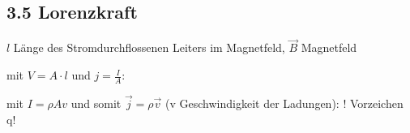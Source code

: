 \subsection*{3.5 Lorenzkraft}
    $l$ Länge des Stromdurchflossenen Leiters im Magnetfeld, $\overrightarrow{B}$ Magnetfeld
    
    mit $V = A \cdot l$ und $j = \frac{I}{A}$:

    mit $I = \rho A v$ und somit $\overrightarrow{j} = \rho \overrightarrow{v}$ (v Geschwindigkeit der Ladungen):
    ! Vorzeichen q!